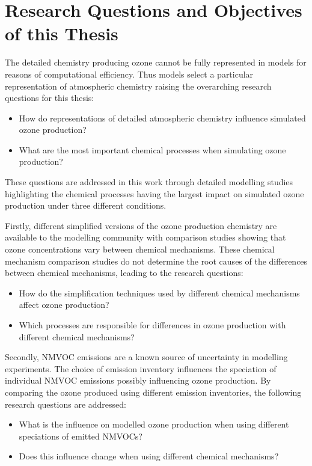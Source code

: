 \section{Research Questions and Objectives of this Thesis} \label{s:research_questions}
\vspace{-4mm}
The detailed chemistry producing ozone cannot be fully represented in models for reasons of computational efficiency.
Thus models select a particular representation of atmospheric chemistry raising the overarching research questions for this thesis:
\begin{itemize}
    \item How do representations of detailed atmospheric chemistry influence simulated ozone production?
    \item What are the most important chemical processes when simulating ozone production?
\end{itemize}
These questions are addressed in this work through detailed modelling studies highlighting the chemical processes having the largest impact on simulated ozone production under three different conditions.

Firstly, different simplified versions of the ozone production chemistry are available to the modelling community with comparison studies showing that ozone concentrations vary between chemical mechanisms.
These chemical mechanism comparison studies do not determine the root causes of the differences between chemical mechanisms, leading to the research questions:
\begin{itemize}
	\item How do the simplification techniques used by different chemical mechanisms affect ozone production? 
    \item Which processes are responsible for differences in ozone production with different chemical mechanisms?
\end{itemize}

Secondly, NMVOC emissions are a known source of uncertainty in modelling experiments.
The choice of emission inventory influences the speciation of individual NMVOC emissions possibly influencing ozone production.
By comparing the ozone produced using different emission inventories, the following research questions are addressed:
\begin{itemize}
	\item What is the influence on modelled ozone production when using different speciations of emitted NMVOCs? 
    \item Does this influence change when using different chemical mechanisms?
\end{itemize}

